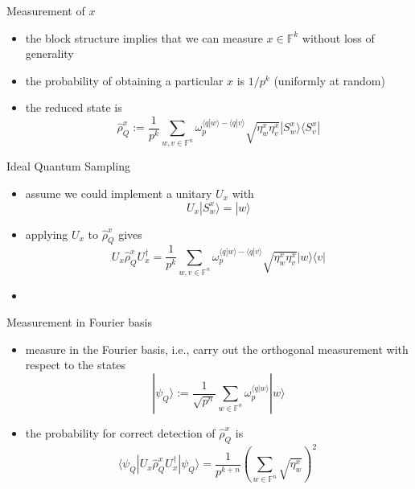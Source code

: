 \documentclass[slideColor]{prosper}
\newcommand{\F}{{\mathbb{F}}}
\renewcommand{\>}{\rangle}
\newcommand{\<}{\langle}
\begin{document}

\begin{slide}{Measurement of $x$}
\begin{itemize}
\item the block structure implies that we can measure $x\in\F^k$ without loss of generality
\item the probability of obtaining a particular $x$ is $1/p^k$ (uniformly at random)
\item the reduced state is
\[
\hat{\rho}_Q^x := 
\frac{1}{p^{k}}
\sum_{w,v\in\F^n} \omega_p^{\<q|w\> - \<q|v\>} \sqrt{\eta_w^x
\eta_v^x} |S_w^x\>\<S_v^x| 
\]
\end{itemize}
\end{slide}


\begin{slide}{Ideal Quantum Sampling}
\begin{itemize}
\item assume we could implement a unitary $U_x$ with
\[
U_x |S_w^x\> = |w\>
\]
\item applying $U_x$ to $\hat{\rho}_Q^x$ gives
\[
U_x \hat{\rho}_Q^x U_x^\dagger = \frac{1}{p^k} \sum_{w,v\in\F^n}
\omega_p^{\<q|w\> - \<q|v\>} \sqrt{\eta_w^x \eta_v^x} |w\>\<v|
\]
\item
\end{itemize}
\end{slide}


\begin{slide}{Measurement in Fourier basis}
\begin{itemize}
\item measure in the Fourier basis, i.e., carry out the orthogonal measurement with respect to the states
\[
|\psi_Q\> := \frac{1}{\sqrt{p^n}} \sum_{w \in \F^n}
 \omega_p^{\<q|w\>} |w\>
\]
\item the probability for correct detection of $\hat{\rho}_Q^x$ is
\[
\< \psi_Q | U_x {\hat \rho}_Q^x U_x^\dagger | \psi_Q \> =
\frac{1}{p^{k+n}} \left( \sum_{w \in \F^n} \sqrt{\eta_w^x}
\right)^2\
\]
\end{itemize}
\end{slide}

\end{document}
